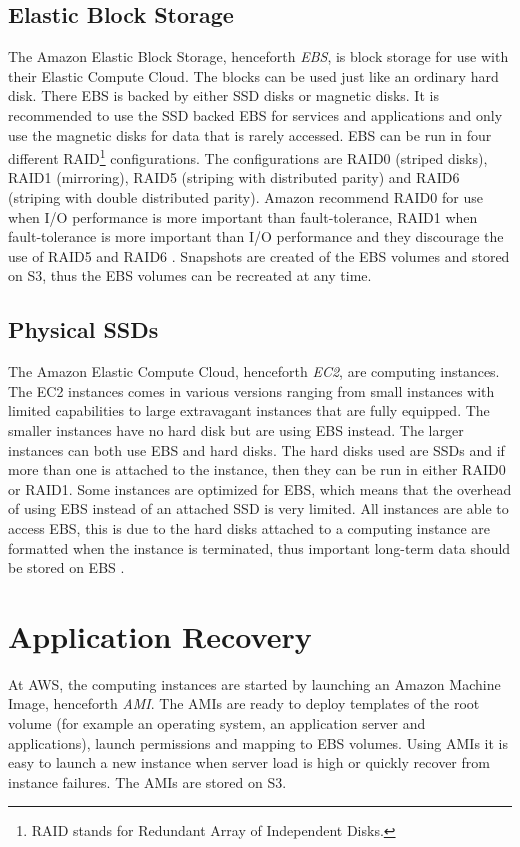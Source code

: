 \documentclass[11pt]{report}
\begin{document}
\subsection{Elastic Block Storage}
The Amazon Elastic Block Storage, henceforth \emph{EBS}, is block storage for use with their Elastic Compute Cloud. The blocks can be used just like an ordinary hard disk. There EBS is backed by either SSD disks or magnetic disks. It is recommended to use the SSD backed EBS for services and applications and only use the magnetic disks for data that is rarely accessed. EBS can be run in four different RAID\footnote{RAID stands for Redundant Array of Independent Disks.} configurations. The configurations are RAID0 (striped disks), RAID1 (mirroring), RAID5 (striping with distributed parity) and RAID6 (striping with double distributed parity). Amazon recommend RAID0 for use when I/O performance is more important than fault-tolerance, RAID1 when fault-tolerance is more important than I/O performance and they discourage the use of RAID5 and RAID6 \cite{AWS_raid_config}. Snapshots are created of the EBS volumes and stored on S3, thus the EBS volumes can be recreated at any time.

\subsection{Physical SSDs}
The Amazon Elastic Compute Cloud, henceforth \emph{EC2}, are computing instances. The EC2 instances comes in various versions ranging from small instances with limited capabilities to large extravagant instances that are fully equipped. The smaller instances have no hard disk but are using EBS instead. The larger instances can both use EBS and hard disks. The hard disks used are SSDs and if more than one is attached to the instance, then they can be run in either RAID0 or RAID1. Some instances are optimized for EBS, which means that the overhead of using EBS instead of an attached SSD is very limited. All instances are able to access EBS, this is due to the hard disks attached to a computing instance are formatted when the instance is terminated, thus important long-term data should be stored on EBS \cite{AWS_instance_storage}. 

\section{Application Recovery}
At AWS, the computing instances are started by launching an Amazon Machine Image, henceforth \emph{AMI}. The AMIs are ready to deploy templates of the root volume (for example an operating system, an application server and applications), launch permissions and mapping to EBS volumes. Using AMIs it is easy to launch a new instance when server load is high or quickly recover from instance failures. The AMIs are stored on S3.
\end{document}

